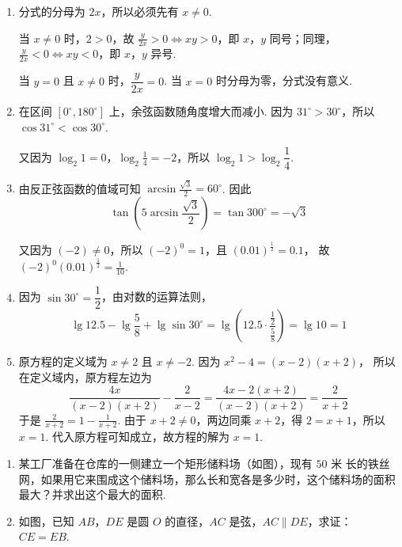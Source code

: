 \begin{solution}
\begin{enumerate}
\item 分式的分母为 \(2x\)，所以必须先有 \(x\ne0\).

当 \(x\ne0\) 时，\(2>0\)，故 \(\frac{y}{2x}>0\Longleftrightarrow xy>0\)，即 \(x\)，\(y\) 同号；同理，\(\frac{y}{2x}<0\Longleftrightarrow xy<0\)，即 \(x\)，\(y\) 异号.

当 \(y=0\) 且 \(x\ne0\) 时，\(\dfrac{y}{2x}=0\). 当 \(x=0\) 时分母为零，分式没有意义.

\item 在区间 \([0^\circ,180^\circ]\) 上，余弦函数随角度增大而减小. 因为 \(31^\circ>30^\circ\)，所以
\(\cos31^\circ<\cos30^\circ\).

又因为 \(\log_2 1=0\)，\(\log_2\frac{1}{4}=-2\)，所以 \(\log_2 1>\log_2\dfrac{1}{4}\).

\item 由反正弦函数的值域可知
\(\arcsin\frac{\sqrt{3}}{2}=60^\circ\).
因此
\[
\tan\left(5\arcsin\frac{\sqrt{3}}{2}\right)
=\tan300^\circ=-\sqrt{3}
\]

又因为 \((-2)\ne0\)，所以 \((-2)^0=1\)，且
\(\left(0.01\right)^{\frac{1}{2}}=0.1\)，
故
\(\left(-2\right)^0\left(0.01\right)^{\frac{1}{2}}=\frac{1}{10}\).

\item 因为 \(\sin30^\circ=\dfrac{1}{2}\)，由对数的运算法则，
\[
\lg 12.5-\lg\frac{5}{8}+\lg\sin30^\circ
=\lg\left(12.5\cdot\frac{\frac{1}{2}}{\frac{5}{8}}\right)=\lg10=1
\]

\item 原方程的定义域为 \(x\ne2\) 且 \(x\ne-2\). 因为
\(x^2-4=\left(x-2\right)\left(x+2\right)\)，
所以在定义域内，原方程左边为
\[
\frac{4x}{\left(x-2\right)\left(x+2\right)}-\frac{2}{x-2}
=\frac{4x-2\left(x+2\right)}{\left(x-2\right)\left(x+2\right)}
=\frac{2}{x+2}
\]
于是 \(\frac{2}{x+2}=1-\frac{1}{x+2}\).
由于 \(x+2\ne0\)，两边同乘 \(x+2\)，得 \(2=x+1\)，所以 \(x=1\). 代入原方程可知成立，故方程的解为 \(x=1\).
\end{enumerate}
\end{solution}

\begin{problem}
\begin{enumerate}
\item 某工厂准备在仓库的一侧建立一个矩形储料场（如图），现有 \(50\text{ 米}\) 长的铁丝网，如果用它来围成这个储料场，那么长和宽各是多少时，这个储料场的面积最大？并求出这个最大的面积.

\item 如图，已知 \(AB\)，\(DE\) 是圆 \(O\) 的直径，\(AC\) 是弦，\(AC\parallel DE\)，求证：\(CE=EB\).

\end{enumerate}

\end{problem}

